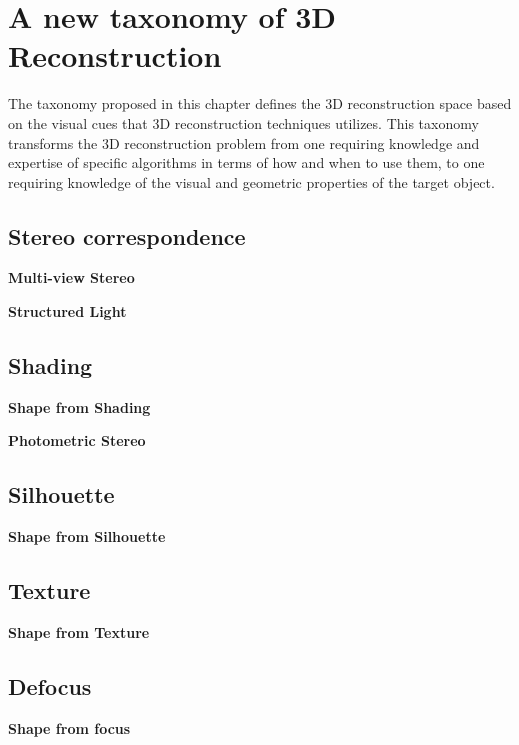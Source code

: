 
\chapter{A new taxonomy of 3D Reconstruction}
\label{ch:3DRecon_Tax}

The taxonomy proposed in this chapter defines the 3D reconstruction space based on the visual cues that 3D reconstruction techniques utilizes. This taxonomy transforms the 3D reconstruction problem from one requiring knowledge and expertise of specific algorithms in terms of how and when to use them, to one requiring knowledge of the visual and geometric properties of the target object.

\section{Stereo correspondence}
\textbf{Multi-view Stereo}

\textbf{Structured Light}

\section{Shading}
\textbf{Shape from Shading}

\textbf{Photometric Stereo}

\section{Silhouette}
\textbf{Shape from Silhouette}

\section{Texture}
\textbf{Shape from Texture}

\section{Defocus}
\textbf{Shape from focus}
